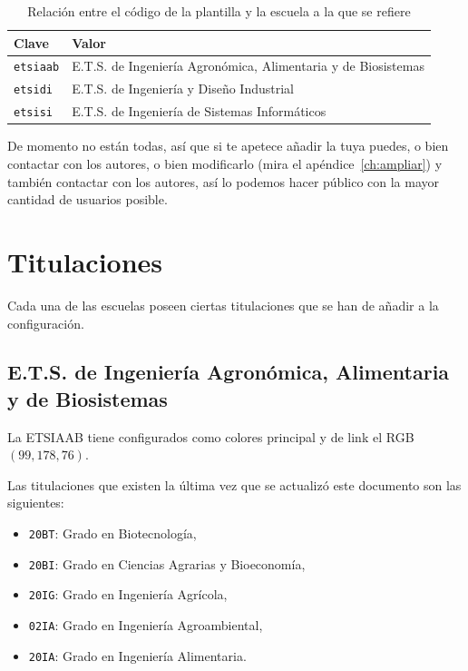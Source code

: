 \documentclass[%
    school=etsisi,%
    type=tfg,%
    degree=61CD,%
]{upm-report}
\begin{document}
\begin{table}
    \centering
    \begin{tabularx}{\textwidth}{@{}lX@{}}
        \toprule
        \textbf{Clave}   & \textbf{Valor} \\
        \midrule
        \texttt{etsiaab} & E.T.S. de Ingeniería Agronómica, Alimentaria y de Biosistemas \\
        \texttt{etsidi}  & E.T.S. de Ingeniería y Diseño Industrial \\
        \texttt{etsisi}  & E.T.S. de Ingeniería de Sistemas Informáticos \\
        \bottomrule
    \end{tabularx}
    \caption{\label{tbl:schools} Relación entre el código de la plantilla y la escuela a la que se refiere}
\end{table}

De momento no están todas, así que si te apetece añadir la tuya puedes, o bien contactar con los autores, o bien modificarlo (mira el apéndice~\ref{ch:ampliar}) y también contactar con los autores, así lo podemos hacer público con la mayor cantidad de usuarios posible.

\section{Titulaciones}

Cada una de las escuelas poseen ciertas titulaciones que se han de añadir a la configuración.

\subsection{E.T.S. de Ingeniería Agronómica, Alimentaria y de Biosistemas}

La ETSIAAB tiene configurados como colores principal y de link el RGB $(99,178,76)$.

Las titulaciones que existen la última vez que se actualizó este documento son las siguientes:

\begin{itemize}
    \item \texttt{20BT}: Grado en Biotecnología,
    \item \texttt{20BI}: Grado en Ciencias Agrarias y Bioeconomía,
    \item \texttt{20IG}: Grado en Ingeniería Agrícola,
    \item \texttt{02IA}: Grado en Ingeniería Agroambiental,
    \item \texttt{20IA}: Grado en Ingeniería Alimentaria.
\end{itemize}
\end{document}
